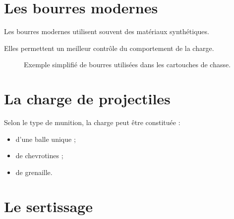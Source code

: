 \section{Les bourres modernes}

Les bourres modernes utilisent souvent des matériaux synthétiques.

Elles permettent un meilleur contrôle du comportement de la charge.

\begin{figure}[htbp]
\centering


\caption{Exemple simplifié de bourres utilisées dans les cartouches de chasse.}
\label{fig:bourres_chasse}

\end{figure}

\section{La charge de projectiles}

Selon le type de munition, la charge peut être constituée :

\begin{itemize}
    \item d'une balle unique ;
    \item de chevrotines ;
    \item de grenaille.
\end{itemize}

\section{Le sertissage}


